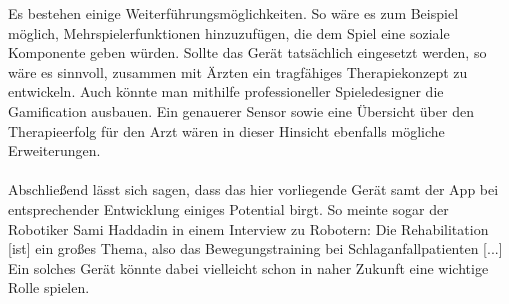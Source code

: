 Es bestehen einige Weiterführungsmöglichkeiten. So wäre es zum Beispiel möglich, Mehrspielerfunktionen hinzuzufügen, die dem Spiel eine soziale Komponente geben würden. Sollte das Gerät tatsächlich eingesetzt werden, so wäre es sinnvoll, zusammen mit Ärzten ein tragfähiges Therapiekonzept zu entwickeln. Auch könnte man mithilfe professioneller Spieledesigner die Gamification ausbauen. Ein genauerer Sensor sowie eine Übersicht über den Therapieerfolg für den Arzt wären in dieser Hinsicht ebenfalls mögliche Erweiterungen. \\ \\
Abschließend lässt sich sagen, dass das hier vorliegende Gerät samt der App bei entsprechender Entwicklung einiges Potential birgt. So meinte sogar der Robotiker Sami Haddadin in einem Interview zu Robotern: \glqq Die Rehabilitation [ist] ein großes Thema, also das Bewegungstraining bei Schlaganfallpatienten [...]\grqq\cite{Src:CTHaddadin} Ein solches Gerät könnte dabei vielleicht schon in naher Zukunft eine wichtige Rolle spielen.